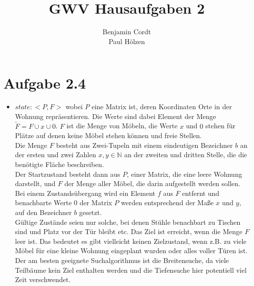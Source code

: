 \documentclass[12pt, paper=a4]{article}
\author{Benjamin Cordt\\Paul Hölzen}
\title{GWV Hausaufgaben 2}
\begin{document}
\maketitle

\section*{Aufgabe 2.4}
\begin{itemize}
\item $state: <P,F>$ wobei $P$ eine Matrix ist, deren Koordinaten Orte in der Wohnung repräsentieren.
      Die Werte sind dabei Element der Menge $\tilde{F} = F \cup x \cup 0$.
      $F$ ist die Menge von Möbeln, die Werte $x$ und $0$ stehen für Plätze auf denen keine
      Möbel stehen können und freie Stellen.\\
      Die Menge $F$ besteht aus Zwei-Tupeln mit einem eindeutigen Bezeichner $b$ an der ersten
      und zwei Zahlen $x, y \in \mathbb{N}$ an der zweiten und dritten Stelle, die die benötigte
      Fläche beschreiben.\\
      
      Der Startzustand besteht dann aus $P$, einer Matrix, die eine leere Wohnung darstellt, und
      $F$ der Menge aller Möbel, die darin aufgestellt werden sollen. Bei einem Zustandsübergang
      wird ein Element $f$ aus $F$ entfernt und benachbarte Werte $0$ der Matrix $P$ werden
      entsprechend der Maße $x$ und $y$, auf den Bezeichner $b$ gesetzt.\\
      Gültige Zustände seien nur solche, bei denen Stühle benachbart zu Tischen sind und Platz
      vor der Tür bleibt etc. Das Ziel ist erreicht, wenn die Menge $F$ leer ist. Das bedeutet es
      gibt vielleicht keinen Zielzustand, wenn z.B. zu viele Möbel für eine kleine Wohnung eingeplant
      wurden oder alles voller Türen ist.\\
      Der am besten geeignete Suchalgorithmus ist die Breitensuche, da viele Teilbäume kein Ziel
      enthalten werden und die Tiefensuche hier potentiell viel Zeit verschwendet.


\end{itemize}
\end{document}
